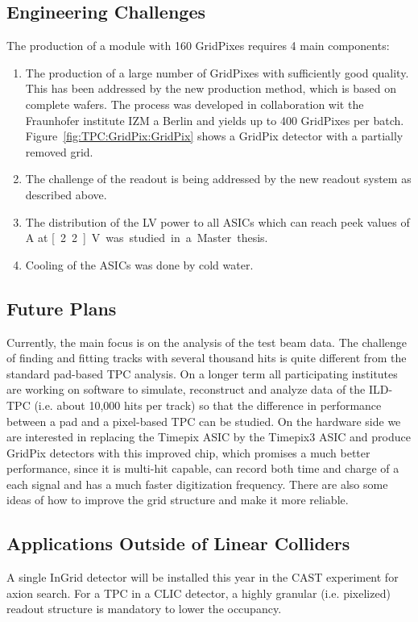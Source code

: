 \subsection{Engineering Challenges}
The production of a module with 160 GridPixes requires 4 main components:
\begin{enumerate}
	\item The production of a large number of GridPixes with sufficiently good quality. This has been addressed by the new production method, which is based on complete wafers. The process was developed in collaboration wit the Fraunhofer institute IZM a Berlin and yields up to 400 GridPixes per batch. Figure~\ref{fig:TPC:GridPix:GridPix} shows a GridPix detector with a partially removed grid.
	\item The challenge of the readout is being addressed by the new readout system as described above.
	\item The distribution of the LV power to all ASICs which can reach peek values of \unit[85]{A} at \unit[2.2]{V} was studied in a Master thesis.
	\item Cooling of the ASICs was done by cold water.
\end{enumerate}


\subsection{Future Plans}
Currently, the main focus is on the analysis of the test beam data. The challenge of finding and fitting tracks with several thousand hits is quite different from the standard pad-based TPC analysis. On a longer term all participating institutes are working on software to simulate, reconstruct and analyze data of the ILD-TPC (i.e. about 10,000 hits per track) so that the difference in performance between a pad and a pixel-based TPC can be studied.
On the hardware side we are interested in replacing the Timepix ASIC by the Timepix3 ASIC and produce GridPix detectors with this improved chip, which promises a much better performance, since it is multi-hit capable, can record both time and charge of a each signal and has a much faster digitization frequency. There are also some ideas of how to improve the grid structure and make it more reliable.

\subsection{Applications Outside of Linear Colliders}
A single InGrid detector will be installed this year in the CAST experiment for axion search. For a TPC in a CLIC detector, a highly granular (i.e. pixelized) readout structure is mandatory to lower the occupancy.
